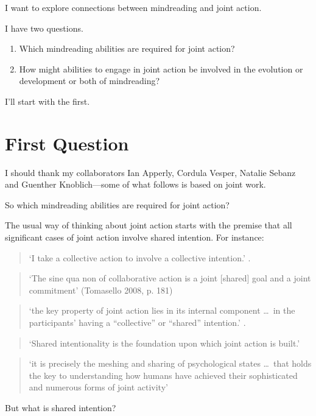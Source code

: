 \documentclass[12pt,a4paper]{extarticle}
\begin{document}
I want to explore connections between mindreading and joint action.

I have two questions.
%
\begin{enumerate}
\item Which mindreading abilities are required for joint action?
\item How might abilities to engage in joint action be involved in the evolution or development or both of mindreading?
\end{enumerate}
%
I'll start with the first.

\section{First Question}
I should thank my collaborators Ian Apperly, Cordula Vesper, Natalie Sebanz and Guenther Knoblich---some of what follows is based on joint work.

So which mindreading abilities are required for joint action?

The usual way of thinking about joint action starts with the premise that all significant cases of joint action involve shared intention.  For instance:  
%
\begin{quote} 
`I take a collective action to involve a collective intention.'  \citep[p.\ 5]{Gilbert:2006wr}.
\end{quote}
%
\begin{quote} 
`The sine qua non of collaborative action is a joint [shared] goal and a joint commitment’ 
(Tomasello 2008, p. 181)
\end{quote} 
%
%
\begin{quote}
`the key property of joint action lies in its internal component \ldots \ in the participants’ having a ``collective'' or ``shared'' intention.' \citep[pp. 444-5]{alonso_shared_2009}.
\end{quote}
%
\begin{quote}
`Shared intentionality is the foundation upon which joint action is built.' \citep[p.\ 381]{Carpenter:2009wq}
\end{quote}
%
\begin{quote}
`it is precisely the meshing and sharing of psychological states \ldots \ that holds the key to understanding how humans have achieved their sophisticated and numerous forms of joint activity'
\citep[p.\ 369]{Call:2009fk}
\end{quote}

But what is shared intention?
\end{document}
